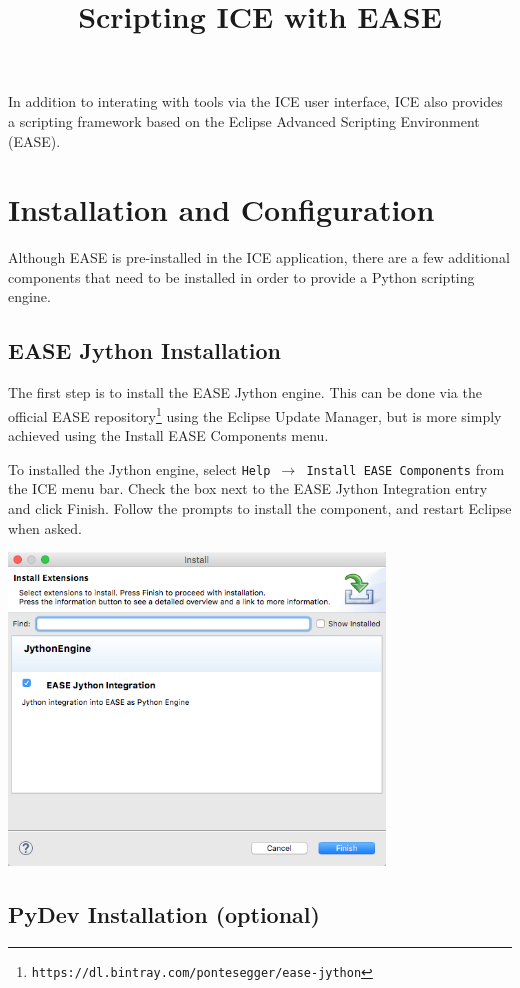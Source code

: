 \documentclass{article}
\begin{document}
\title{Scripting ICE with EASE}

In addition to interating with tools via the ICE user interface, ICE also
provides a scripting framework based on the Eclipse Advanced Scripting
Environment (EASE). 

\section{Installation and Configuration}

Although EASE is pre-installed in the ICE application, there are a few
additional components that need to be installed in order to provide a Python
scripting engine.

\subsection{EASE Jython Installation} 

The first step is to install the EASE Jython engine. This can be done via the
official EASE
repository\footnote{\texttt{https://dl.bintray.com/pontesegger/ease-jython}}
using the Eclipse Update Manager, but is more simply achieved using the Install EASE Components menu.

To installed the Jython engine, select \texttt{Help $\rightarrow$ Install
EASE Components} from the ICE menu bar. Check the box next to the EASE Jython
Integration entry and click Finish. Follow the prompts to install the component,
and restart Eclipse when asked.

\begin{center}
\includegraphics[width=10cm]{images/ease-marketplace}
\end{center}

\subsection{PyDev Installation (optional)} 
\end{document}
